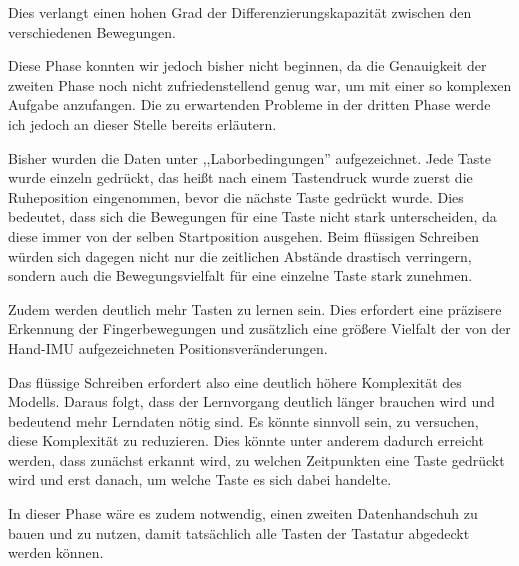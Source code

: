 Dies verlangt einen hohen Grad der Differenzierungskapazität zwischen den verschiedenen Bewegungen.

Diese Phase konnten wir jedoch bisher nicht beginnen, da die Genauigkeit der zweiten Phase noch nicht zufriedenstellend genug war, um mit einer so komplexen Aufgabe anzufangen. Die zu erwartenden Probleme in der dritten Phase werde ich jedoch an dieser Stelle bereits erläutern.

Bisher wurden die Daten unter ,,Laborbedingungen'' aufgezeichnet. Jede Taste wurde einzeln gedrückt, das heißt nach einem Tastendruck wurde zuerst die Ruheposition eingenommen, bevor die nächste Taste gedrückt wurde. Dies bedeutet, dass sich die Bewegungen für eine Taste nicht stark unterscheiden, da diese immer von der selben Startposition ausgehen. Beim flüssigen Schreiben würden sich dagegen nicht nur die zeitlichen Abstände drastisch verringern, sondern auch die Bewegungsvielfalt für eine einzelne Taste stark zunehmen.

Zudem werden deutlich mehr Tasten zu lernen sein. Dies erfordert eine präzisere Erkennung der Fingerbewegungen und zusätzlich eine größere Vielfalt der von der Hand-IMU aufgezeichneten Positionsveränderungen.

Das flüssige Schreiben erfordert also eine deutlich höhere Komplexität des Modells. Daraus folgt, dass der Lernvorgang deutlich länger brauchen wird und bedeutend mehr Lerndaten nötig sind.
Es könnte sinnvoll sein, zu versuchen, diese Komplexität zu reduzieren. Dies könnte unter anderem dadurch erreicht werden, dass zunächst erkannt wird, zu welchen Zeitpunkten eine Taste gedrückt wird und erst danach, um welche Taste es sich dabei handelte.

In dieser Phase wäre es zudem notwendig, einen zweiten Datenhandschuh zu bauen und zu nutzen, damit tatsächlich alle Tasten der Tastatur abgedeckt werden können.
